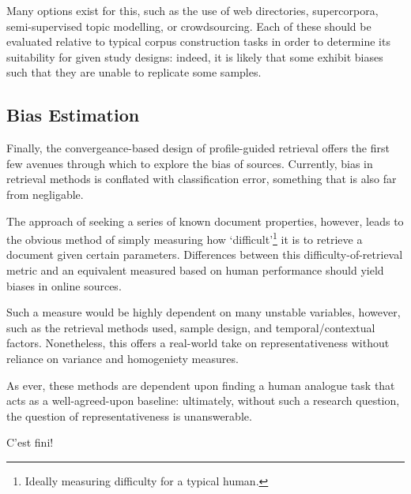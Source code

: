 Many options exist for this, such as the use of web directories, supercorpora, semi-supervised topic modelling, or crowdsourcing.  Each of these should be evaluated relative to typical corpus construction tasks in order to determine its suitability for given study designs: indeed, it is likely that some exhibit biases such that they are unable to replicate some samples.


\subsection{Bias Estimation}
Finally, the convergeance-based design of profile-guided retrieval offers the first few avenues through which to explore the bias of sources.  Currently, bias in retrieval methods is conflated with classification error, something that is also far from negligable.

The approach of seeking a series of known document properties, however, leads to the obvious method of simply measuring how `difficult'\footnote{Ideally measuring difficulty for a typical human.} it is to retrieve a document given certain parameters.  Differences between this difficulty-of-retrieval metric and an equivalent measured based on human performance should yield biases in online sources.

Such a measure would be highly dependent on many unstable variables, however, such as the retrieval methods used, sample design, and temporal/contextual factors.  Nonetheless, this offers a real-world take on representativeness without reliance on variance and homogeniety measures.

As ever, these methods are dependent upon finding a human analogue task that acts as a well-agreed-upon baseline: ultimately, without such a research question, the question of representativeness is unanswerable.




\begin{center}
\vfill
{\selectfont C'est fini!}
\vfill
\end{center}



